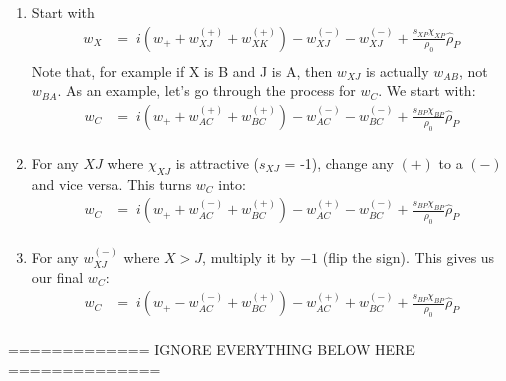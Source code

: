 \documentclass{article}
\begin{document}
\begin{enumerate}
  \item Start with
  {
    \color{red}
    \begin{align*}
      w_X &=\;
        i \left( w_+ + w_{XJ}^{(+)} + w_{XK}^{(+)} \right)
        - w_{XJ}^{(-)} - w_{XJ}^{(-)}
        + \frac{s_{XP}\chi_{XP}}{\rho_0} \hat{\rho}_P \\
    \end{align*}
  }
  Note that, for example if X is B and J is A, then $w_{XJ}$ is actually $w_{AB}$,
    not $w_{BA}$.
  As an example, let's go through the process for $w_C$.
  We start with:
  {
    \color{red}
    \begin{align*}
      w_C &=\;
        i \left( w_+ + w_{AC}^{(+)} + w_{BC}^{(+)} \right)
        - w_{AC}^{(-)} - w_{BC}^{(-)}
        + \frac{s_{BP}\chi_{BP}}{\rho_0} \hat{\rho}_P \\
    \end{align*}
  }

  \item For any $XJ$ where $\chi_{XJ}$ is attractive ($s_{XJ}$ = -1), change any
    $(+)$ to a $(-)$ and vice versa.
  This turns $w_C$ into:
  {
    \color{red}
    \begin{align*}
      w_C &=\;
        i \left( w_+ + w_{AC}^{(-)} + w_{BC}^{(+)} \right)
        - w_{AC}^{(+)} - w_{BC}^{(-)}
        + \frac{s_{BP}\chi_{BP}}{\rho_0} \hat{\rho}_P \\
    \end{align*}
  }

  \item For any $w_{XJ}^{(-)}$ where $X > J$, multiply it by $-1$ (flip the sign).
  This gives us our final $w_C$:
  {
    \color{green}
    \begin{align*}
      w_C &=\;
        i \left( w_+ - w_{AC}^{(-)} + w_{BC}^{(+)} \right)
        - w_{AC}^{(+)} + w_{BC}^{(-)}
        + \frac{s_{BP}\chi_{BP}}{\rho_0} \hat{\rho}_P \\
    \end{align*}
  }
\end{enumerate}

============= IGNORE EVERYTHING BELOW HERE ==============
\end{document}
